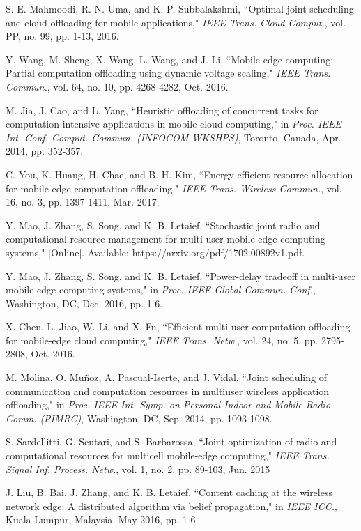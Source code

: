 \documentclass[journal,draftcls,onecolumn,12pt,twoside]{IEEEtran}
\begin{document}
\begin{thebibliography}{1}
S. E. Mahmoodi, R. N. Uma, and K. P. Subbalakshmi, ``Optimal joint scheduling and cloud offloading for mobile applications," \emph{IEEE Trans. Cloud Comput.}, vol. PP, no. 99, pp. 1-13, 2016.

Y. Wang, M. Sheng, X. Wang, L. Wang, and J. Li, ``Mobile-edge computing: Partial computation offloading using dynamic voltage scaling," \emph{IEEE Trans. Commun.}, vol. 64, no. 10, pp. 4268-4282, Oct. 2016.

M. Jia, J. Cao, and L. Yang, ``Heuristic offloading of concurrent tasks for computation-intensive applications in mobile cloud computing," in \emph{Proc. IEEE Int. Conf. Comput. Commun. (INFOCOM WKSHPS)}, Toronto, Canada, Apr. 2014, pp. 352-357.

C. You, K. Huang, H. Chae, and B.-H. Kim, ``Energy-efficient resource allocation for mobile-edge computation offloading," \emph{IEEE Trans. Wireless Commun.}, vol. 16, no. 3, pp. 1397-1411, Mar. 2017.

Y. Mao, J. Zhang, S. Song, and K. B. Letaief, ``Stochastic joint radio and computational resource management for multi-user mobile-edge computing systems," [Online]. Available: https://arxiv.org/pdf/1702.00892v1.pdf.

Y. Mao, J. Zhang, S. Song, and K. B. Letaief, ``Power-delay tradeoff in multi-user mobile-edge computing systems," in \emph{Proc. IEEE Global Commun. Conf.}, Washington, DC, Dec. 2016, pp. 1-6.

X. Chen, L. Jiao, W. Li, and X. Fu, ``Efficient multi-user computation offloading for mobile-edge cloud computing," \emph{IEEE Trans. Netw.}, vol. 24, no. 5, pp. 2795-2808, Oct. 2016.

M. Molina, O. Mu\~noz, A. Pascual-Iserte, and J. Vidal, ``Joint scheduling of communication and computation resources in multiuser wireless application offloading," in \emph{Proc. IEEE Int. Symp. on Personal Indoor and Mobile Radio Comm. (PIMRC)}, Washington, DC, Sep. 2014, pp. 1093-1098.

S. Sardellitti, G. Scutari, and S. Barbarossa, ``Joint optimization of radio and computational resources for multicell mobile-edge computing," \emph{IEEE Trans. Signal Inf. Process. Netw.}, vol. 1, no. 2, pp. 89-103, Jun. 2015

J. Liu, B. Bai, J. Zhang, and K. B. Letaief, ``Content caching at the wireless network edge: A distributed algorithm via belief propagation,"  in \emph{IEEE ICC.}, Kuala Lumpur, Malaysia, May 2016, pp. 1-6.


\end{thebibliography}
\end{document}
